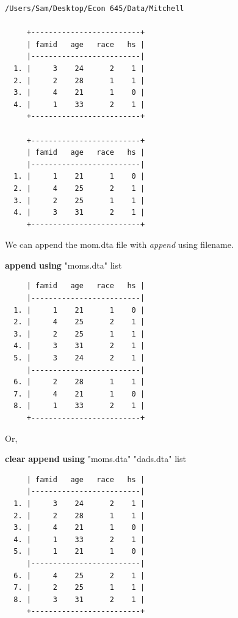 \documentclass[
]{book}
\newenvironment{Shaded}{\begin{snugshade}}{\end{snugshade}}
\newcommand{\KeywordTok}[1]{\textcolor[rgb]{0.13,0.29,0.53}{\textbf{#1}}}
\newcommand{\OtherTok}[1]{\textcolor[rgb]{0.56,0.35,0.01}{#1}}
\newcommand{\StringTok}[1]{\textcolor[rgb]{0.31,0.60,0.02}{#1}}
\begin{document}
\begin{verbatim}
/Users/Sam/Desktop/Econ 645/Data/Mitchell

     +-------------------------+
     | famid   age   race   hs |
     |-------------------------|
  1. |     3    24      2    1 |
  2. |     2    28      1    1 |
  3. |     4    21      1    0 |
  4. |     1    33      2    1 |
     +-------------------------+

     +-------------------------+
     | famid   age   race   hs |
     |-------------------------|
  1. |     1    21      1    0 |
  2. |     4    25      2    1 |
  3. |     2    25      1    1 |
  4. |     3    31      2    1 |
     +-------------------------+
\end{verbatim}

We can append the mom.dta file with \emph{append} using filename.

\begin{Shaded}
\begin{Highlighting}[]
\KeywordTok{append} \KeywordTok{using} \StringTok{"moms.dta"}
\OtherTok{list}
\end{Highlighting}
\end{Shaded}

\begin{verbatim}
     | famid   age   race   hs |
     |-------------------------|
  1. |     1    21      1    0 |
  2. |     4    25      2    1 |
  3. |     2    25      1    1 |
  4. |     3    31      2    1 |
  5. |     3    24      2    1 |
     |-------------------------|
  6. |     2    28      1    1 |
  7. |     4    21      1    0 |
  8. |     1    33      2    1 |
     +-------------------------+
\end{verbatim}

Or,

\begin{Shaded}
\begin{Highlighting}[]
\KeywordTok{clear}
\KeywordTok{append} \KeywordTok{using} \StringTok{"moms.dta"} \StringTok{"dads.dta"}
\OtherTok{list}
\end{Highlighting}
\end{Shaded}

\begin{verbatim}
     | famid   age   race   hs |
     |-------------------------|
  1. |     3    24      2    1 |
  2. |     2    28      1    1 |
  3. |     4    21      1    0 |
  4. |     1    33      2    1 |
  5. |     1    21      1    0 |
     |-------------------------|
  6. |     4    25      2    1 |
  7. |     2    25      1    1 |
  8. |     3    31      2    1 |
     +-------------------------+
\end{verbatim}
\end{document}
